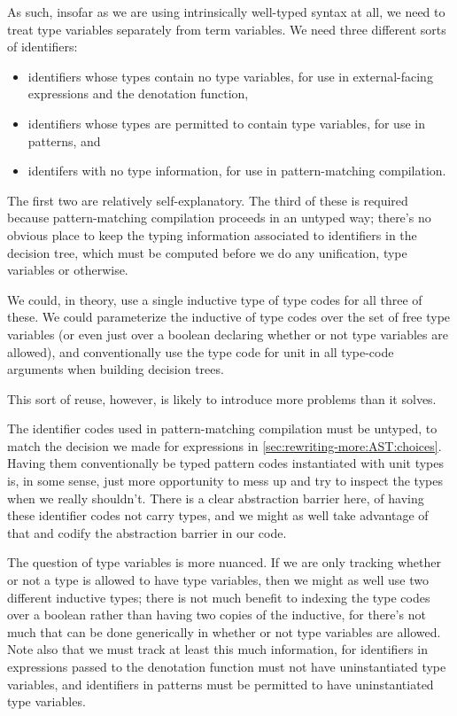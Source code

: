 As such, insofar as we are using intrinsically well-typed syntax at all, we need to treat type variables separately from term variables.
We need three different sorts of identifiers:
\begin{itemize}
\item
  identifiers whose types contain no type variables, for use in external-facing expressions and the denotation function,
\item
  identifiers whose types are permitted to contain type variables, for use in patterns, and
\item
  identifers with no type information, for use in pattern-matching compilation.
\end{itemize}
The first two are relatively self-explanatory.
The third of these is required because pattern-matching compilation proceeds in an untyped way; there's no obvious place to keep the typing information associated to identifiers in the decision tree, which must be computed before we do any unification, type variables or otherwise.

We could, in theory, use a single inductive type of type codes for all three of these.
We could parameterize the inductive of type codes over the set of free type variables (or even just over a boolean declaring whether or not type variables are allowed), and conventionally use the type code for unit in all type-code arguments when building decision trees.

This sort of reuse, however, is likely to introduce more problems than it solves.

The identifier codes used in pattern-matching compilation must be untyped, to match the decision we made for expressions in \autoref{sec:rewriting-more:AST:choices}.
Having them conventionally be typed pattern codes instantiated with unit types is, in some sense, just more opportunity to mess up and try to inspect the types when we really shouldn't.
There is a clear abstraction barrier here, of having these identifier codes not carry types, and we might as well take advantage of that and codify the abstraction barrier in our code.

The question of type variables is more nuanced.
If we are only tracking whether or not a type is allowed to have type variables, then we might as well use two different inductive types; there is not much benefit to indexing the type codes over a boolean rather than having two copies of the inductive, for there's not much that can be done generically in whether or not type variables are allowed.
Note also that we must track at least this much information, for identifiers in expressions passed to the denotation function must not have uninstantiated type variables, and identifiers in patterns must be permitted to have uninstantiated type variables.

